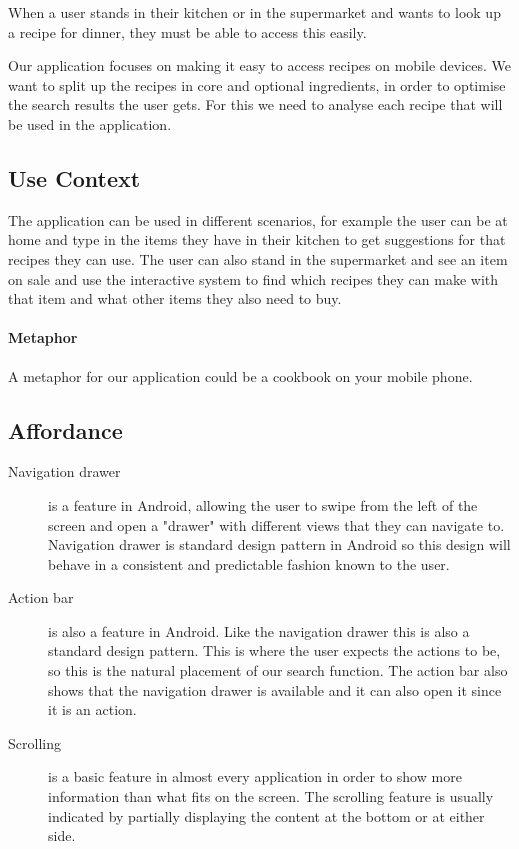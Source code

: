 When a user stands in their kitchen or in the supermarket and wants to look up a recipe for dinner, they must be able to access this easily.

Our application focuses on making it easy to access recipes on mobile devices. We want to split up the recipes in core and optional ingredients, in order to optimise the search results the user gets. For this we need to analyse each recipe that will be used in the application.

\subsection*{Use Context}

The application can be used in different scenarios, for example the user can be at home and type in the items they have in their kitchen to get suggestions for that recipes they can use. The user can also stand in the supermarket and see an item on sale and use the interactive system to find which recipes they can make with that item and what other items they also need to buy. 

\paragraph{Metaphor}

A metaphor for our application could be a cookbook on your mobile phone. 

\subsection*{Affordance}

\begin{description}

\item [Navigation drawer] is a feature in Android, allowing the user to swipe from the left of the screen and open a "drawer" with different views that they can navigate to. Navigation drawer is standard design pattern in Android so this design will behave in a consistent and predictable fashion known to the user.
\item [Action bar] is also a feature in Android. Like the navigation drawer this is also a standard design pattern. This is where the user expects the actions to be, so this is the natural placement of our search function. The action bar also shows that the navigation drawer is available and it can also open it since it is an action. 
\item[Scrolling] is a basic feature in almost every application in order to show more information than what fits on the screen. The scrolling feature is usually indicated by partially displaying the content at the bottom or at either side.

\end{description}


